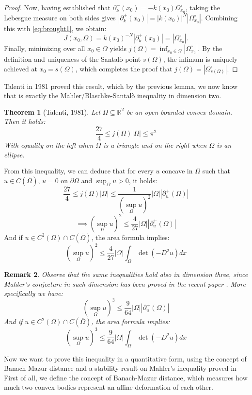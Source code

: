 \documentclass[10pt,a4paper]{amsart}
\newtheorem{theorem}{Theorem}[section]
\newtheorem{remark}[theorem]{Remark}
\numberwithin{equation}{section}
\begin{document}
\begin{proof}
\noindent Now, having established that $\partial^+_k(x_0) = -k(x_0)\Omega^\circ_{x_0}$, taking the Lebesgue measure on both sides gives $|\partial^+_k(x_0)| = |k(x_0)|^N |\Omega^\circ_{x_0}|$. Combining this with \eqref{eq:brought1}, we obtain:
\[
J(x_0, \Omega) = k(x_0)^{-N} |\partial^+_k(x_0)| = |\Omega^\circ_{x_0}|.
\]
Finally, minimizing over all $x_0 \in \Omega$ yields $j(\Omega) = \inf_{x_0 \in \Omega} |\Omega^\circ_{x_0}|$. By the definition and uniqueness of the Santalò point $s(\Omega)$, the infimum is uniquely achieved at $x_0 = s(\Omega)$, which completes the proof that $j(\Omega) = |\Omega^\circ_{s(\Omega)}|$.
\end{proof}
\noindent Talenti in 1981 proved this result, which by the previous lemma, we now know that is exactly the Mahler/Blaschke-Santalò inequality in dimension two.
\begin{theorem}[Talenti, 1981]
    Let $\Omega \subseteq \mathbb{R}^2$ be an open bounded convex domain. Then it holds:
    $$\frac{27}{4}\leq j(\Omega)|\Omega|\leq \pi^2 $$
    With equality on the left when $\Omega$ is a triangle and on the right when $\Omega$ is an ellipse.
\end{theorem}
\noindent From this inequality, we can deduce that for every $u$ concave in $\Omega$ such that $u \in C({\overline{\Omega}})$, $u = 0$ on  $\partial \Omega$ and $\sup_\Omega u >0$, it holds:
$$\frac{27}{4} \leq j(\Omega) |\Omega| \leq \frac{1}{(\sup_\Omega u)^2}|\Omega||\partial^+_u(\Omega)| $$
    $$\implies (\sup_\Omega u)^2 \leq \frac{4}{27}|\Omega||\partial^+_u(\Omega)|$$
    \noindent And if $u \in C^{2}(\Omega)\cap C(\overline{\Omega})$, the area formula implies:
    $$(\sup_\Omega u)^2 \leq\frac{4}{27}|\Omega|\int_\Omega \det (-D^2u) dx$$
\begin{remark}
    Observe that the same inequalities hold also in dimension three, since Mahler's conjecture in such dimension has been proved in the recent paper \cite{chen2026mahler}. More specifically we have:
    $$(\sup_\Omega u)^3 \leq \frac{9}{64}|\Omega||\partial^+_u(\Omega)|$$
    \noindent And if $u \in C^{2}(\Omega) \cap C(\overline{\Omega})$, the area formula implies:
    \begin{equation}\label{eq:Talenti3}
    (\sup_\Omega u)^3 \leq\frac{9}{64}|\Omega|\int_\Omega \det (-D^2u) dx
    \end{equation}
\end{remark}
\noindent Now we want to prove this inequality in a quantitative form, using the concept of Banach-Mazur distance and a stability result on Mahler's inequality proved in \cite{boroczky2013}
First of all, we define the concept of Banach-Mazur distance, which measures how much two convex bodies represent an affine deformation of each other.
\end{document}
